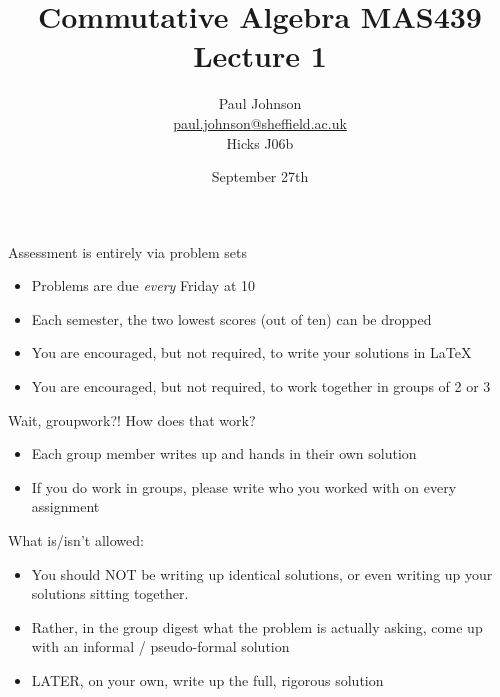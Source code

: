 \documentclass{beamer}
\title{Commutative Algebra MAS439 \\ Lecture 1}
\author{Paul Johnson \\ \href{mailto:paul.johnson@sheffield.ac.uk}{paul.johnson@sheffield.ac.uk} \\ Hicks J06b}
\date{September 27th}
\begin{document}
\begin{frame}
\titlepage
\end{frame}


\begin{frame}{Assessment is entirely via problem sets}

\begin{itemize}
\item Problems are due \emph{every} Friday at 10
\item Each semester, the two lowest scores (out of ten) can be dropped
\item You are encouraged, but not required, to write your solutions in \LaTeX
\item You are encouraged, but not required, to work together in groups of 2 or 3
\end{itemize}
\end{frame}


\begin{frame}{Wait, groupwork?! How does that work?}

\begin{itemize}
\item Each group member writes up and hands in their own solution
\item If you do work in groups, please write who you worked with on every assignment
\end{itemize}

\begin{block}{What is/isn't allowed:}
\begin{itemize}
\item You should \alert{NOT} be writing up identical solutions, or even writing up your solutions sitting together.  
\item Rather, in the group digest what the problem is actually asking, come up with an informal / pseudo-formal solution
\item \alert{LATER}, on your own, write up the full, rigorous solution
\end{itemize}
\end{block}

\end{frame}
\end{document}
